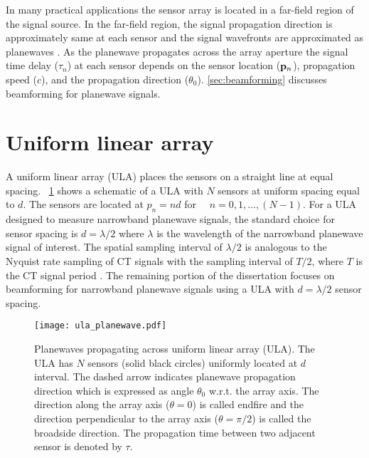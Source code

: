 In many practical applications the sensor array is located in a
far-field region of the signal source. In the far-field region, the
signal propagation direction is approximately same at each sensor and
the signal wavefronts are approximated as planewaves
\cite{johnson1992array}. As the planewave propagates across the array
aperture the signal time delay ($\tau_n$) at each sensor depends on
the sensor location ($\mathbf{p}_n$), propagation speed ($c$), and the
propagation direction ($\theta_0$). \sect{}\ref{sec:beamforming} discusses beamforming for planewave signals.


\section{Uniform linear array}
\label{sec:ula}
A uniform linear array (ULA) places the sensors on a straight line at equal
spacing. \figurename{}~\ref{fig:ula-geom} shows a schematic of a ULA
with $N$ sensors at uniform spacing equal to $d$. The sensors are
located at $p_n = nd$ for $\quad n = 0, 1, \ldots, (N - 1)$. For a ULA
designed to measure narrowband planewave signals, the standard choice
for sensor spacing is $d = \lambda/2$ where $\lambda$ is the wavelength
of the narrowband planewave signal of interest. The spatial sampling
interval of $\lambda/2$ is analogous to the Nyquist rate sampling of
CT signals with the sampling interval of $T/2$, where $T$ is the CT
signal period \cite{Oppenheim1989}. The remaining portion of the dissertation
focuses on beamforming for  narrowband planewave signals using a ULA with $d = \lambda/2$ sensor spacing.
\begin{figure}[!hp]
 \centering
    \texttt{[image: ula\_planewave.pdf]}
    \caption[Planewaves propagating across uniform linear array (ULA).]{Planewaves propagating across uniform linear array (ULA). The ULA has $N$ sensors (solid black circles) uniformly located at $d$ interval. The dashed arrow indicates planewave propagation direction which is expressed as angle $\theta_0$ w.r.t. the array axis. The direction along the array axis ($\theta = 0$) is called endfire and the direction perpendicular to the array axis ($\theta = \pi/2$) is called the broadside direction. The propagation time between two adjacent sensor is denoted by $\tau$.} 
\label{fig:ula-geom}
\end{figure}

